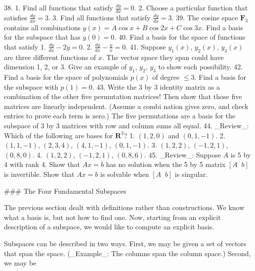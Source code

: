 38. 1. Find all functions that satisfy \(\frac{dy}{dx}=0\). 2. Choose a particular function that satisfies \(\frac{dy}{dx}=3\). 3. Find all functions that satisfy \(\frac{dy}{dx}=3\).
39. The cosine space \(\mathbf{F}_{3}\) contains all combinations \(y(x)=A\cos x+B\cos 2x+C\cos 3x\). Find a basis for the subspace that has \(y(0)=0\).
40. Find a basis for the space of functions that satisfy 1. \(\frac{dy}{dx}-2y=0\). 2. \(\frac{dy}{dx}-\frac{y}{x}=0\).
41. Suppose \(y_{1}(x)\), \(y_{2}(x)\), \(y_{3}(x)\) are three different functions of \(x\). The vector space they span could have dimension 1, 2, or 3. Give an example of \(y_{1}\), \(y_{2}\), \(y_{3}\) to show each possibility.
42. Find a basis for the space of polynomials \(p(x)\) of degree \(\leq 3\). Find a basis for the subspace with \(p(1)=0\).
43. Write the 3 by 3 identity matrix as a combination of the other five permutation matrices! Then show that those five matrices are linearly independent. (Assume a combi nation gives zero, and check entries to prove each term is zero.) The five permutations are a basis for the subspace of 3 by 3 matrices with row and column sums all equal.
44. _Review_: Which of the following are bases for \(\mathbf{R}^{3}\)? 1. \((1,2,0)\) and \((0,1,-1)\). 2. \((1,1,-1)\), \((2,3,4)\), \((4,1,-1)\), \((0,1,-1)\). 3. \((1,2,2)\), \((-1,2,1)\), \((0,8,0)\). 4. \((1,2,2)\), \((-1,2,1)\), \((0,8,6)\).
45. _Review_: Suppose \(A\) is 5 by 4 with rank 4. Show that \(Ax=b\) has no solution when the 5 by 5 matrix \([A\;\;b]\) is invertible. Show that \(Ax=b\) is solvable when \([A\;\;b]\) is singular.

### The Four Fundamental Subspaces

The previous section dealt with definitions rather than constructions. We know what a basis is, but not how to find one. Now, starting from an explicit description of a subspace, we would like to compute an explicit basis.

Subspaces can be described in two ways. First, we may be given a set of vectors that span the space. (_Example_: The columns span the column space.) Second, we may be 